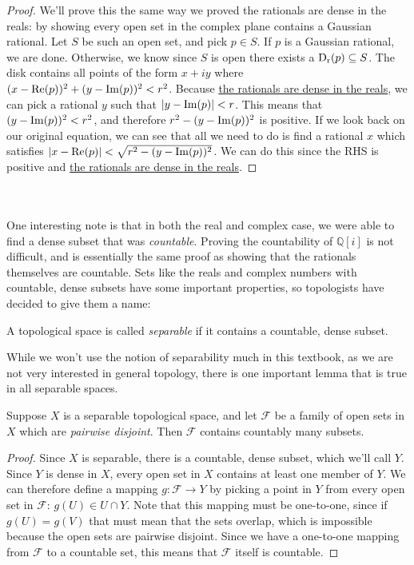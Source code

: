 \begin{proof}
We'll prove this the same way we proved the rationals are dense in the reals: by showing every open set in the complex plane contains a Gaussian rational. Let $S$ be such an open set, and pick $p \in S$. If $p$ is a Gaussian rational, we are done. Otherwise, we know since $S$ is open there exists a $\disk{p}{r} \subseteq S$. The disk contains all points of the form $x+iy$ where $(x-\rpart{p})^2+(y-\ipart{p})^2 < r^2$. Because \hyperlink{Density of Rationals in Reals}{the rationals are dense in the reals}, we can pick a rational $y$ such that $\modulus{y-\ipart{p}} < r$. This means that $(y-\ipart{p})^2 < r^2$, and therefore $r^2-(y-\ipart{p})^2$ is positive. If we look back on our original equation, we can see that all we need to do is find a rational $x$ which satisfies $\modulus{x-\rpart{p}} < \sqrt{r^2-(y-\ipart{p})^2}$. We can do this since the RHS is positive and \hyperlink{Density of Rationals in Reals}{the rationals are dense in the reals}.
\end{proof}
\\\\One interesting note is that in both the real and complex case, we were able to find a dense subset that was \emph{countable}. Proving the countability of $\mathbb{Q} [i]$ is not difficult, and is essentially the same proof as showing that the rationals themselves are countable. Sets like the reals and complex numbers with countable, dense subsets  have some important properties, so topologists have decided to give them a name:
\begin{definition}
A topological space is called \emph{separable} if it contains a countable, dense subset.
\end{definition}
While we won't use the notion of separability much in this textbook, as we are not very interested in general topology, there is one important lemma that is true in all separable spaces.
\begin{lemma}
Suppose $X$ is a separable topological space, and let $\mathcal{F}$ be a family of open sets in $X$ which are \emph{pairwise disjoint}. Then $\mathcal{F}$ contains countably many subsets.
\end{lemma}
\begin{proof}
Since $X$ is separable, there is a countable, dense subset, which we'll call $Y$. Since $Y$ is dense in $X$, every open set in $X$ contains at least one member of $Y$. We can therefore define a mapping $g: \mathcal{F} \to Y$ by picking a point in $Y$ from every open set in $\mathcal{F}$: $g(U) \in U \cap Y$. Note that this mapping must be one-to-one, since if $g(U)=g(V)$ that must mean that the sets overlap, which is impossible because the open sets are pairwise disjoint. Since we have a one-to-one mapping from $\mathcal{F}$ to a countable set, this means that $\mathcal{F}$ itself is countable.
\end{proof}
